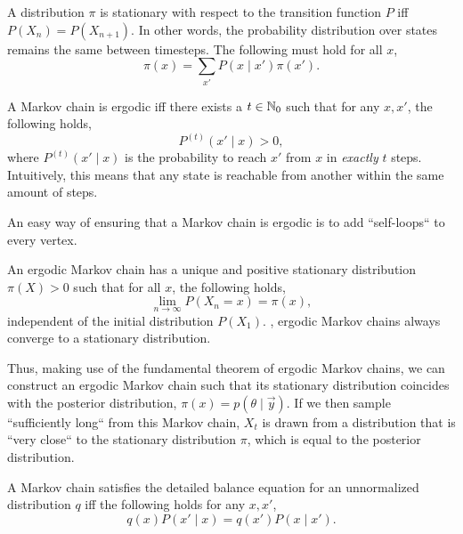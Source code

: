 \begin{definition}
    A distribution $\pi$ is stationary with respect to the transition function
    $P$ iff $P(X_n) = P(X_{n+1})$. In other words, the probability distribution
    over states remains the same between timesteps. The following must hold for
    all $x$, \[
        \pi(x) = \sum_{x'} P(x\mid x')\pi(x').
    \]
\end{definition}

\begin{definition}[Ergodicity]
    A Markov chain is ergodic iff there exists a $t\in\mathbb{N}_0$ such that for any
    $x,x'$, the following holds, \[
        P^{(t)} (x'\mid x) > 0,
    \]
    where $P^{(t)}(x'\mid x)$ is the probability to reach $x'$ from $x$ in
    \textit{exactly} $t$ steps. Intuitively, this means that any state is
    reachable from another within the same amount of steps.
\end{definition}

\begin{remark}
    An easy way of ensuring that a Markov chain is ergodic is to add
    ``self-loops`` to every vertex.
\end{remark}

\begin{theorem}
    An ergodic Markov chain has a unique and positive stationary distribution
    $\pi(X)>0$ such that for all $x$, the following holds, \[
        \lim_{n\to\infty} P(X_n = x) = \pi(x),
    \]
    independent of the initial distribution $P(X_1)$. \Ie, ergodic Markov chains
    always converge to a stationary distribution.
\end{theorem}

Thus, making use of the fundamental theorem of ergodic Markov chains, we can
construct an ergodic Markov chain such that its stationary distribution
coincides with the posterior distribution, $\pi(x) = p(\theta\mid\vec{y})$. If
we then sample ``sufficiently long`` from this Markov chain, $X_t$ is drawn
from a distribution that is ``very close`` to the stationary distribution
$\pi$, which is equal to the posterior distribution.

\begin{definition}
    A Markov chain satisfies the detailed balance equation for an unnormalized
    distribution $q$ iff the following holds for any $x,x'$, \[
        q(x)P(x'\mid x) = q(x')P(x\mid x').
    \]
\end{definition}

